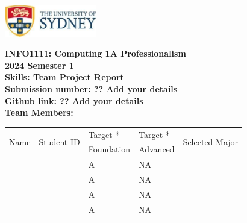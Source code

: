 \documentclass[a4paper, 11pt]{report}
\begin{document}
\begin{titlepage}
\begin{flushright}
\includegraphics[width=4cm]{USyd}\\[1cm]
\end{flushright}

\begin{centering}
\textbf{\huge INFO1111: Computing 1A Professionalism}\\[0.75cm]
\textbf{\huge 2024 Semester 1}\\[2cm]
\textbf{\huge Skills: Team Project Report}\\[2cm]

\textbf{\large Submission number: ?? Add your details}\\[0.5cm]
\textbf{\large Github link: ?? Add your details}\\[0.75cm]
\textbf{\huge Team Members:}\\[0.75cm]

\begin{tabular}{|p{}|p{}|p{}|p{}|p{}|}
	\hline
	\multirow{2}{*}{Name} & \multirow{2}{*}{Student ID} & Target * & Target * & \multirow{2}{*}{Selected Major} \\
	 & & Foundation & Advanced & \\
	\hline
	\hline
	\raggedright{\studA} & \sidA & A & NA & \majA \\
	\hline
	\raggedright{\studB} & \sidB & A & NA & \majB \\
	\hline
	\raggedright{\studC} & \sidC & A & NA & \majC \\
	\hline
	\raggedright{\studD} & \sidD & A & NA & \majD \\
	\hline
\end{tabular}
\\[0.5cm]
\end{centering}

\thispagestyle{empty}
\end{titlepage}



\tableofcontents


\end{document}
